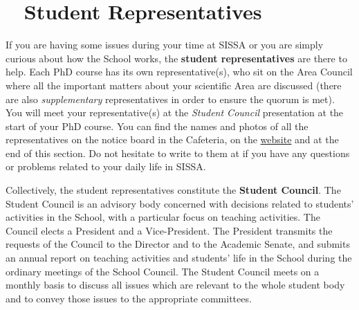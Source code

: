 \documentclass{sissavademecum}
\begin{document}
\chapter{\texorpdfstring{\faFlag\ }{} Student Representatives}

If you are having some issues during your time at SISSA or you are simply curious about how the School works, the \textbf{student representatives} are there to help. Each PhD course has its own representative(s), who sit on the Area Council where all the important matters about your scientific Area are discussed (there are also \textit{supplementary} representatives in order to ensure the quorum is met). You will meet your representative(s) at the \emph{Student Council} presentation at the start of your PhD course. You can find the names and photos of all the representatives on the notice board in the Cafeteria, on the \href{http://students.sissa.it/}{website} and at the end of this section. Do not hesitate to write to them at  if you have any questions or problems related to your daily life in SISSA.

Collectively, the student representatives constitute the \textbf{Student Council}. The Student Council is an advisory body concerned with decisions related to students' activities in the School, with a particular focus on teaching activities. The Council elects a President and a Vice-President. The President transmits the requests of the Council to the Director and to the Academic Senate, and submits an annual report on teaching activities and students' life in the School during the ordinary meetings of the School Council. The Student Council meets on a monthly basis to discuss all issues which are relevant to the whole student body and to convey those issues to the appropriate committees.
\end{document}
